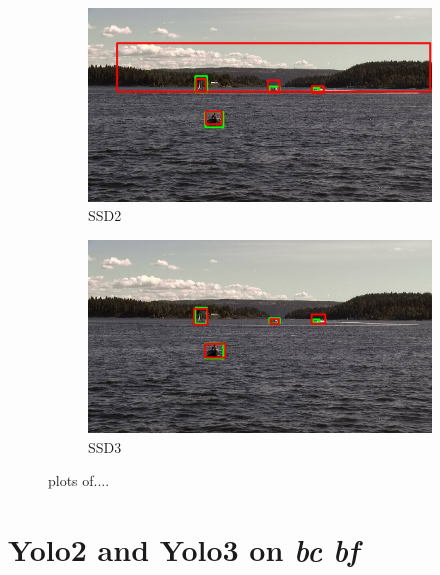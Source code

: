 \begin{figure}
\begin{subfigure}{.5\textwidth}
  \centering
  \includegraphics[width=0.9\linewidth]{results/case_buildings/bigbox_bcbf/SSD2/selected_08_14_frame1150.jpg}
  \caption{SSD2}
  \label{fig:sfig1}
\end{subfigure}%
\begin{subfigure}{.5\textwidth}
  \centering
  \includegraphics[width=.9\linewidth]{results/case_buildings/bigbox_bcbf/SSD3/selected_08_14_frame1150.jpg}
  \caption{SSD3}
  \label{fig:sfig2}
\end{subfigure}

\caption{plots of....}
\label{fig:fig}
\end{figure}

\newpage

\section{Yolo2 and Yolo3 on \textit{bc} \textit{bf}}
\label{sec:yolo23_bcbf}

